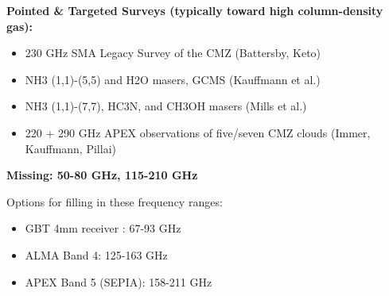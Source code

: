 {\bf Pointed & Targeted Surveys (typically toward high column-density gas):}
\begin{itemize}
    \item 230 GHz SMA Legacy Survey of the CMZ (Battersby, Keto)
    \item NH3 (1,1)-(5,5) and H2O masers, GCMS (Kauffmann et al.)
    \item NH3 (1,1)-(7,7), HC3N, and CH3OH masers (Mills et al.)
    \item 220 + 290 GHz APEX observations of five/seven CMZ clouds (Immer, Kauffmann, Pillai)
\end{itemize}

{\bf Missing: 50-80 GHz, 115-210 GHz}

Options for filling in these frequency ranges:
\begin{itemize}
\item GBT 4mm receiver : 67-93 GHz
\item ALMA Band 4: 125-163 GHz
\item APEX Band 5 (SEPIA): 158-211 GHz
\end{itemize}